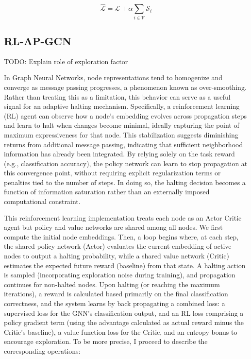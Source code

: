 \documentclass{gdl}
\begin{document}
$$ \mathcal{\hat{L}} = \mathcal{L} + \alpha \sum_{i\in \mathcal{V}} \mathcal{S}_i $$


\subsection{RL-AP-GCN}
TODO: Explain role of exploration factor

In Graph Neural Networks, node representations tend to homogenize and converge as message passing progresses, a phenomenon known as over-smoothing. Rather than treating this as a limitation, this behavior can serve as a useful signal for an adaptive halting mechanism. Specifically, a reinforcement learning (RL) agent can observe how a node's embedding evolves across propagation steps and learn to halt when changes become minimal, ideally capturing the point of maximum expressiveness for that node. This stabilization suggests diminishing returns from additional message passing, indicating that sufficient neighborhood information has already been integrated. By relying solely on the task reward (e.g., classification accuracy), the policy network can learn to stop propagation at this convergence point, without requiring explicit regularization terms or penalties tied to the number of steps. In doing so, the halting decision becomes a function of information saturation rather than an externally imposed computational constraint.

This reinforcement learning implementation treats each node as an Actor Critic agent but policy and value networks are shared among all nodes. We first compute the initial node embeddings. Then, a loop begins where, at each step, the shared policy network (Actor) evaluates the current embedding of active nodes to output a halting probability, while a shared value network (Critic) estimates the expected future reward (baseline) from that state. A halting action is sampled (incorporating exploration noise during training), and propagation continues for non-halted nodes. Upon halting (or reaching the maximum iterations), a reward is calculated based primarily on the final classification correctness, and the system learns by back propagating a combined loss: a supervised loss for the GNN's classification output, and an RL loss comprising a policy gradient term (using the advantage calculated as actual reward minus the Critic's baseline), a value function loss for the Critic, and an entropy bonus to encourage exploration. To be more precise, I proceed to describe the corresponding operations: 
\end{document}
